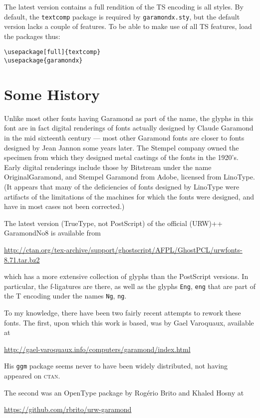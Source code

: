 \documentclass[11pt]{article}
\begin{document}
The latest version contains a full rendition of the TS encoding is all styles. By default, the \verb|textcomp| package is required by {\tt garamondx.sty}, but the default version lacks a couple of features. To be able to make use of all TS features, load the packages thus:
\begin{verbatim}
\usepackage[full]{textcomp}
\usepackage{garamondx}
\end{verbatim}

\section{Some History}
Unlike most other fonts having Garamond as part of the name, the glyphs in this font are in fact digital renderings of fonts actually designed by Claude Garamond in the mid sixteenth century --- most other Garamond fonts are closer to fonts designed by Jean Jannon some years later. The Stempel company owned the specimen from which they designed metal castings of the fonts in the 1920's. Early digital renderings include those by Bitstream under the name OriginalGaramond, and Stempel Garamond from Adobe,  licensed from LinoType. (It appears that many of the deficiencies of fonts designed by LinoType were artifacts of the limitations of the machines for which the fonts were designed, and have in most cases not been corrected.) 

The latest version (TrueType, not PostScript) of the official (URW)++ GaramondNo8 is available from

\url{http://ctan.org/tex-archive/support/ghostscript/AFPL/GhostPCL/urwfonts-8.71.tar.bz2}

which has a more extensive collection of glyphs than the PostScript versions. In particular, the f-ligatures are there, as well as the glyphs \texttt{Eng}, \texttt{eng} that are part of the T encoding under the names \texttt{Ng}, \texttt{ng}.

To my knowledge, there have been two fairly recent attempts to rework these fonts. The first, upon which this work is based, was by Gael Varoquaux, available at

\url{http://gael-varoquaux.info/computers/garamond/index.html}

His \texttt{ggm} package seems never to have been widely distributed, not having appeared on \textsc{ctan}. 

The second was an OpenType package by Rog\'erio Brito and Khaled Hosny at

\url{https://github.com/rbrito/urw-garamond}
\end{document}
